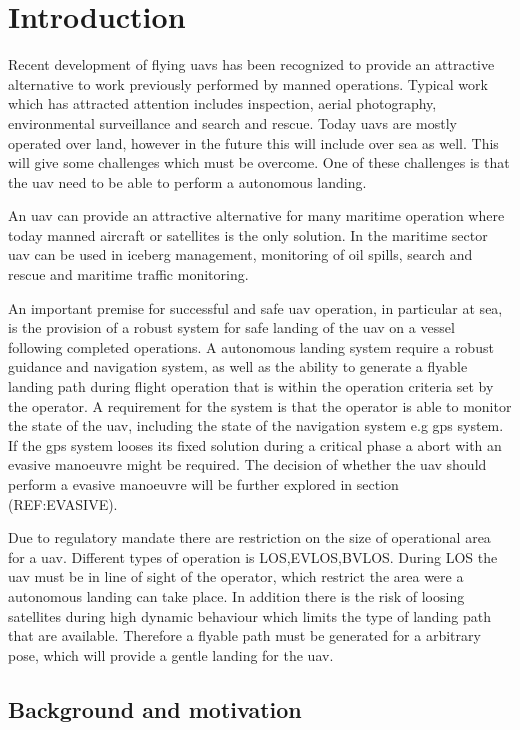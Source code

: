 
\chapter{Introduction}
Recent development of flying \glspl{uav} has been recognized to provide an attractive alternative to work previously performed by manned operations. Typical work which has attracted attention includes inspection, aerial photography, environmental surveillance and search and rescue. Today \glspl{uav} are mostly operated over land, however in the future this will include over sea as well. This will give some challenges which must be overcome. One of these challenges is that the \gls{uav} need to be able to perform a autonomous landing.

An \gls{uav} can provide an attractive alternative for many maritime operation where today manned aircraft or satellites is the only solution. In the maritime sector \gls{uav} can be used in iceberg management, monitoring of oil spills, search and rescue and maritime traffic monitoring.

An important premise for successful and safe \gls{uav} operation, in particular at sea, is the provision of a robust system for safe landing of the \gls{uav} on a vessel following completed operations. A autonomous landing system require a robust guidance and navigation system, as well as the ability to generate a flyable landing path during flight operation that is within the operation criteria set by the operator. A requirement for the system is that the operator is able to monitor the state of the uav, including the state of the navigation system e.g gps system. If the gps system looses its fixed solution during a critical phase a abort with an evasive manoeuvre might be required. The decision of whether the uav should perform a evasive manoeuvre will be further explored in section (REF:EVASIVE).

Due to regulatory mandate there are restriction on the size of operational area for a uav. Different types of operation is LOS,EVLOS,BVLOS. During LOS the uav must be in line of sight of the operator, which restrict the area were a autonomous landing can take place. In addition there is the risk of loosing satellites during high dynamic behaviour which limits the type of landing path that are available. Therefore a flyable path must be generated for a arbitrary pose, which will provide a gentle landing for the uav.
\section{Background and motivation}
 


